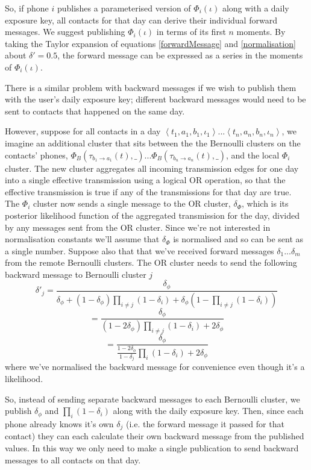 \documentclass{article}
\begin{document}
So, if phone $i$ publishes a parameterised version of $\Phi_i(\iota)$ along with a daily exposure key, all contacts for that day can derive their individual forward messages. We suggest publishing $\Phi_i(\iota)$ in terms of its first $n$ moments. By taking the Taylor expansion of equations \ref{forwardMessage} and \ref{normalisation} about $\delta' = 0.5$, the forward message can be expressed as a series in the moments of $\Phi_i(\iota)$.

There is a similar problem with backward messages if we wish to publish them with the user's daily exposure key; different backward messages would need to be sent to contacts that happened on the same day.

However, suppose for all contacts in a day $\left<t_1,a_1,b_1,\iota_1\right>...\left<t_n,a_n,b_n,\iota_n\right>$, we imagine an additional cluster that sits between the the Bernoulli clusters on the contacts' phones, $ \Phi_B(\tau_{b_1\rightarrow a_1}(t),\_) ... \Phi_B(\tau_{b_n\rightarrow a_n}(t),\_)$, and the local $\Phi_i$ cluster. The new cluster aggregates all incoming transmission edges for one day into a single effective transmission using a logical OR operation, so that the effective transmission is true if any of the transmissions for that day are true. The $\Phi_i$ cluster now sends a single message to the OR cluster, $\delta_\Phi$, which is its posterior likelihood function of the aggregated transmission for the day, divided by any messages sent from the OR cluster. Since we're not interested in normalisation constants we'll assume that $\delta_\Phi$ is normalised and so can be sent as a single number. Suppose also that that we've received forward messages $\delta_1...\delta_m$ from the remote Bernoulli clusters. The OR cluster needs to send the following backward message to Bernoulli cluster $j$
\[
\delta'_j = \frac{\delta_\phi}{\delta_\phi + (1-\delta_\phi)\prod_{i\ne j}(1-\delta_i) + \delta_\phi(1 - \prod_{i\ne j}(1-\delta_i))}
\]
\[
= \frac{\delta_\phi}{ (1-2\delta_\phi)\prod_{i\ne j}(1-\delta_i) + 2\delta_\phi}
\]
\[
= \frac{\delta_\phi}{ \frac{1-2\delta_\phi}{1-\delta_j}\prod_{i}(1-\delta_i) + 2\delta_\phi}
\]
where we've normalised the backward message for convenience even though it's a likelihood.

So, instead of sending separate backward messages to each Bernoulli cluster, we publish $\delta_\phi$ and $\prod_i (1-\delta_i)$ along with the daily exposure key. Then, since each phone already knows it's own $\delta_j$ (i.e. the forward message it passed for that contact) they can each calculate their own backward message from the published values. In this way we only need to make a single publication to send backward messages to all contacts on that day.
\end{document}
